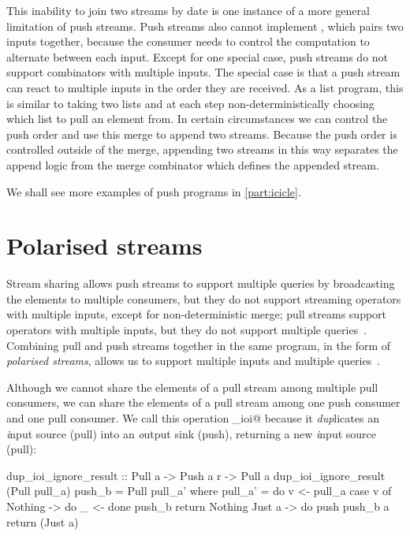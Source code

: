 This inability to join two streams by date is one instance of a more general limitation of push streams.
Push streams also cannot implement \Hs@zip@, which pairs two inputs together, because the consumer needs to control the computation to alternate between each input.
Except for one special case, push streams do not support combinators with multiple inputs.
The special case is that a push stream can react to multiple inputs in the order they are received.
As a list program, this is similar to taking two lists and at each step non-deterministically choosing which list to pull an element from.
In certain circumstances we can control the push order and use this merge to append two streams.
Because the push order is controlled outside of the merge, appending two streams in this way separates the append logic from the merge combinator which defines the appended stream.

We shall see more examples of push programs in \cref{part:icicle}.

\section{Polarised streams}
\label{taxonomy/polarised}

Stream sharing allows push streams to support multiple queries by broadcasting the elements to multiple consumers, but they do not support streaming operators with multiple inputs, except for non-deterministic merge; pull streams support operators with multiple inputs, but they do not support multiple queries~\citep{kay2009you}.
Combining pull and push streams together in the same program, in the form of \emph{polarised streams}, allows us to support multiple inputs and multiple queries~\citep{lippmeier2016polarized}.


Although we cannot share the elements of a pull stream among multiple pull consumers, we can share the elements of a pull stream among one push consumer and one pull consumer.
We call this operation \Hs@dup_ioi@ because it \emph{dup}licates an \emph{i}nput source (pull) into an \emph{o}utput sink (push), returning a new \emph{i}nput source (pull):

\begin{haskell}
dup_ioi_ignore_result :: Pull a -> Push a r -> Pull a
dup_ioi_ignore_result (Pull pull_a) push_b = Pull pull_a'
 where
  pull_a' = do
    v <- pull_a
    case v of
     Nothing -> do
      _ <- done push_b
      return Nothing
     Just a -> do
      push push_b a
      return (Just a)
\end{haskell}

